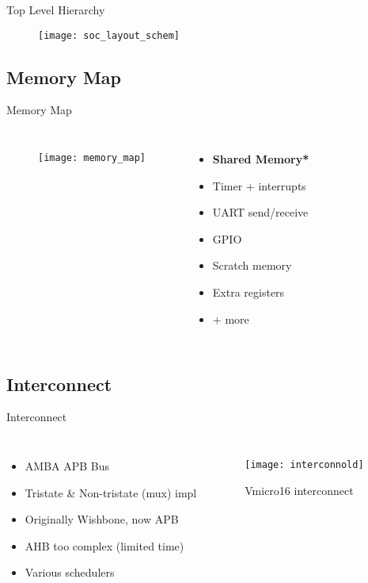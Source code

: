 \documentclass[aspectratio=169]{beamer}
\begin{document}
\begin{frame}{Top Level Hierarchy}
\vspace{-.3cm}
\begin{figure}
\texttt{[image: soc\_layout\_schem]}
\end{figure}
\end{frame}

\subsection{Memory Map}
\begin{frame}{Memory Map}
\begin{columns}
\begin{figure}
\texttt{[image: memory\_map]}
\end{figure}
\begin{itemize}
    \item \textbf{Shared Memory*}
    \item Timer + interrupts
    \item UART send/receive 
    \item GPIO
    \item Scratch memory
    \item Extra registers
    \item + more
\end{itemize}
\end{columns}
\end{frame}

\subsection{Interconnect}
\begin{frame}{Interconnect}
\begin{columns}[t]
\begin{itemize}
    \item AMBA APB Bus
    \item Tristate \& Non-tristate (mux) impl
    \item Originally Wishbone, now APB
    \item AHB too complex (limited time)
    \item Various schedulers
\end{itemize}
\begin{figure}
    \centering
    \texttt{[image: interconnold]}
    \caption{Vmicro16 interconnect}
    \label{fig:my_label}
\end{figure}
\end{columns}
\end{frame}
\end{document}
